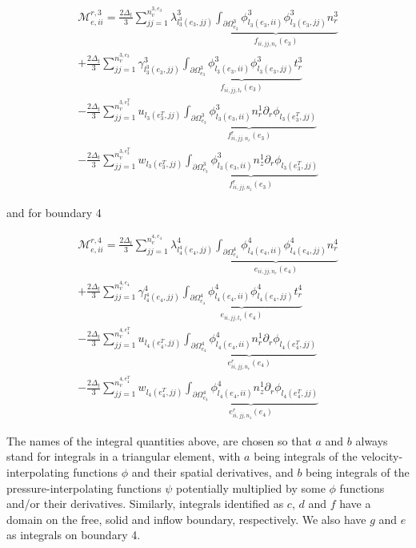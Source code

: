 \documentclass{article}
\begin{document}
\begin{equation}
\begin{array}{l} \mathcal{M}_{e,ii}^{r,3} = \frac{2\Delta_t}{3} \sum_{jj=1}^{n_v^{3,e_3}} \lambda_{l_3^3(e_3,jj)}^3 \underbrace{ \int_{\partial \Omega_{e_3}^{3}} \phi_{l_3(e_3,ii)}^3 \phi_{l_3(e_3,jj)}^3 n_r^3 }_{f_{ii,jj,n_r}(e_3)} \\ + \frac{2\Delta_t}{3} \sum_{jj=1}^{n_v^{3,e_3}} \gamma_{l_3^3(e_3,jj)}^3 \underbrace{ \int_{\partial \Omega_{e_3}^{3}} \phi_{l_3(e_3,ii)}^3 \phi_{l_3(e_3,jj)}^3 t_r^3 }_{f_{ii,jj,t_r}(e_3)} \\ - \frac{2\Delta_t}{3} \sum_{jj=1}^{n_v^{3,e_3^T}} u_{l_3(e_3^T,jj)} \underbrace{ \int_{\partial \Omega_{e_3}^{3}} \phi_{l_3(e_3,ii)}^3 n_r^1 \partial_r \phi_{l_3(e_3^T,jj)} }_{f_{ii,jj,n_r}^r(e_3)} \\ - \frac{2\Delta_t}{3} \sum_{jj=1}^{n_v^{3,e_3^T}} w_{l_3(e_3^T,jj)} \underbrace{ \int_{\partial \Omega_{e_3}^{3}} \phi_{l_3(e_3,ii)}^3 n_z^1 \partial_r \phi_{l_3(e_3^T,jj)} }_{f_{ii,jj,n_z}^r(e_3)} \end{array} \tag{4.138}
\end{equation}

and for boundary 4

\begin{equation}
\begin{array}{l} \mathcal{M}_{e,ii}^{r,4} = \frac{2\Delta_t}{3} \sum_{jj=1}^{n_v^{4,e_4}} \lambda_{l_4^4(e_4,jj)}^4 \underbrace{ \int_{\partial \Omega_{e_4}^{4}} \phi_{l_4(e_4,ii)}^4 \phi_{l_4(e_4,jj)}^4 n_r^4 }_{e_{ii,jj,n_r}(e_4)} \\ + \frac{2\Delta_t}{3} \sum_{jj=1}^{n_v^{4,e_4}} \gamma_{l_4^4(e_4,jj)}^4 \underbrace{ \int_{\partial \Omega_{e_4}^{4}} \phi_{l_4(e_4,ii)}^4 \phi_{l_4(e_4,jj)}^4 t_r^4 }_{e_{ii,jj,t_r}(e_4)} \\ - \frac{2\Delta_t}{3} \sum_{jj=1}^{n_v^{4,e_4^T}} u_{l_4(e_4^T,jj)} \underbrace{ \int_{\partial \Omega_{e_4}^{4}} \phi_{l_4(e_4,ii)}^4 n_r^1 \partial_r \phi_{l_4(e_4^T,jj)} }_{e_{ii,jj,n_r}^r(e_4)} \\ - \frac{2\Delta_t}{3} \sum_{jj=1}^{n_v^{4,e_4^T}} w_{l_4(e_4^T,jj)} \underbrace{ \int_{\partial \Omega_{e_4}^{4}} \phi_{l_4(e_4,ii)}^4 n_z^1 \partial_r \phi_{l_4(e_4^T,jj)} }_{e_{ii,jj,n_z}^r(e_4)} \end{array} \tag{4.139}
\end{equation}

The names of the integral quantities above, are chosen so that \(a\) and \(b\) always stand for integrals in a triangular element, with \(a\) being integrals of the velocity-interpolating functions \(\phi\) and their spatial derivatives, and \(b\) being integrals of the pressure-interpolating functions \(\psi\) potentially multiplied by some \(\phi\) functions and/or their derivatives. Similarly, integrals identified as \(c\), \(d\) and \(f\) have a domain on the free, solid and inflow boundary, respectively. We also have \(g\) and \(e\) as integrals on boundary 4.
\end{document}
